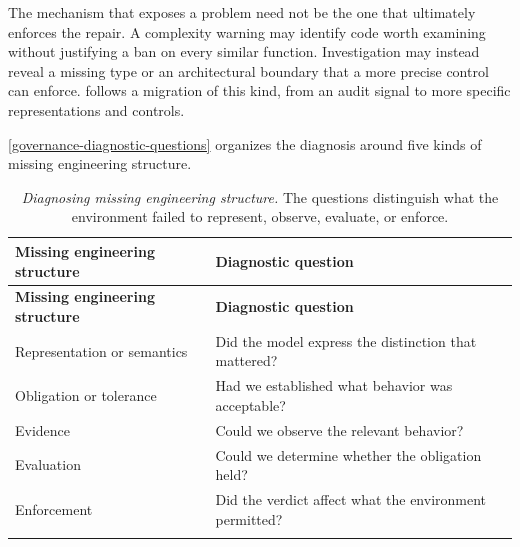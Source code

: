 
The mechanism that exposes a problem need not be the one that ultimately enforces the repair. A complexity warning may identify code worth examining without justifying a ban on every similar function. Investigation may instead reveal a missing type or an architectural boundary that a more precise control can enforce.  follows a migration of this kind, from an audit signal to more specific representations and controls.


\autoref{governance-diagnostic-questions} organizes the diagnosis around five kinds of missing engineering structure.

\begin{longtable}[]{@{}
  >{\raggedright\arraybackslash}p{}
  >{\raggedright\arraybackslash}p{}@{}}
\caption[Diagnosing missing engineering structure]{\emph{Diagnosing missing engineering structure.} The questions distinguish what the environment failed to represent, observe, evaluate, or enforce.}\label{governance-diagnostic-questions}\tabularnewline
\toprule\noalign{}
\textbf{Missing engineering structure} & \textbf{Diagnostic question} \\
\midrule\noalign{}
\endfirsthead
\toprule\noalign{}
\textbf{Missing engineering structure} & \textbf{Diagnostic question} \\
\midrule\noalign{}
\endhead
Representation or semantics & Did the model express the distinction that mattered? \\
Obligation or tolerance & Had we established what behavior was acceptable? \\
Evidence & Could we observe the relevant behavior? \\
Evaluation & Could we determine whether the obligation held? \\
Enforcement & Did the verdict affect what the environment permitted? \\
\bottomrule\noalign{}
\end{longtable}

